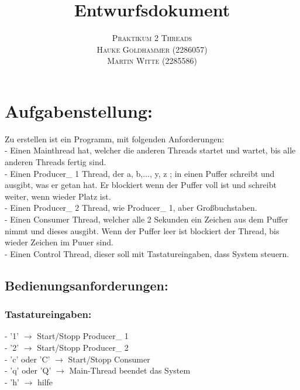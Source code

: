 \documentclass[paper=a4, fontsize=12pt]{article}
\title{\vspace{-15mm}\fontsize{24pt}{10pt}\selectfont\textbf{Entwurfsdokument}} %
\author{
    \large
    {\textsc{Praktikum 2 Threads}}\\[2mm]
    {\textsc{Hauke Goldhammer (2286057)}}\\[2mm]
    {\textsc{Martin Witte (2285586)}}\\[2mm]
}
\begin{document}
\maketitle %
\thispagestyle{fancy} %

\section{Aufgabenstellung:}
Zu erstellen ist ein Programm, mit folgenden Anforderungen:\\
- Einen Mainthread hat, welcher die anderen Threads startet und wartet, bis alle anderen Threads fertig sind.\\
- Einen Producer\_ 1 Thread, der a, b,..., y, z ; in einen Puffer schreibt und ausgibt, was er getan hat. Er blockiert wenn der Puffer voll ist und schreibt weiter, wenn wieder Platz ist.\\
- Einen Producer\_ 2 Thread, wie Producer\_ 1, aber Großbuchstaben.\\
- Einen Consumer Thread, welcher alle 2 Sekunden ein Zeichen aus dem Puffer nimmt und dieses ausgibt. Wenn der Puffer leer ist blockiert der Thread, bis wieder Zeichen im Puuer sind.\\
- Einen Control Thread, dieser soll mit Tastatureingaben, dass System steuern.

\subsection{Bedienungsanforderungen:}
\subsubsection{Tastatureingaben:}
- '1' $\rightarrow$ Start/Stopp Producer\_ 1\\
- '2' $\rightarrow$ Start/Stopp Producer\_ 2\\
- 'c' oder 'C' $\rightarrow$ Start/Stopp Consumer\\
- 'q' oder 'Q' $\rightarrow$ Main-Thread beendet das System\\
- 'h' $\rightarrow$ hilfe\\
\end{document}

